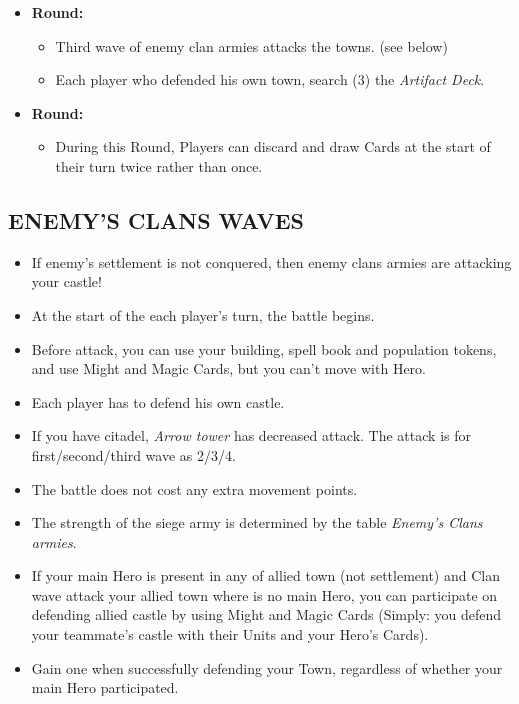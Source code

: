 \begin{multicols}{2}
\begin{itemize}
   \item \textbf{ Round:}
    \begin{itemize}
      \item Third wave of enemy clan armies attacks the towns. (see below)
      \item Each player who defended his own town, search (3) the \textit{Artifact Deck}.
    \end{itemize}
   \item \textbf{ Round:}
    \begin{itemize}
      \item During this Round, Players can discard and draw Cards at the start of their turn twice rather than once.
    \end{itemize}
  \end{itemize}

\subsection*{\MakeUppercase{Enemy's clans waves}}
\begin{itemize}
  \item If enemy's settlement is not conquered, then enemy clans armies are attacking your castle!
  \item At the start of the each player's turn, the battle begins.
  \item Before attack, you can use your building, spell book and population tokens, and use Might and Magic Cards, but you can't move with Hero.
  \item Each player has to defend his own castle.
  \item If you have citadel, \textit{Arrow tower} has decreased attack. The attack is for first/second/third wave as 2/3/4.
  \item The battle does not cost any extra movement points.
  \item The strength of the siege army is determined by the table \textit{Enemy's Clans armies}.
  \item If your main Hero is present in any of allied town (not settlement) and Clan wave attack your allied town where is no main Hero, you can participate on defending allied castle by using Might and Magic Cards (Simply: you defend your teammate's castle with their Units and your Hero's Cards).
  \item Gain one  when successfully defending your Town, regardless of whether your main Hero participated.
\end{itemize}


\end{multicols}
